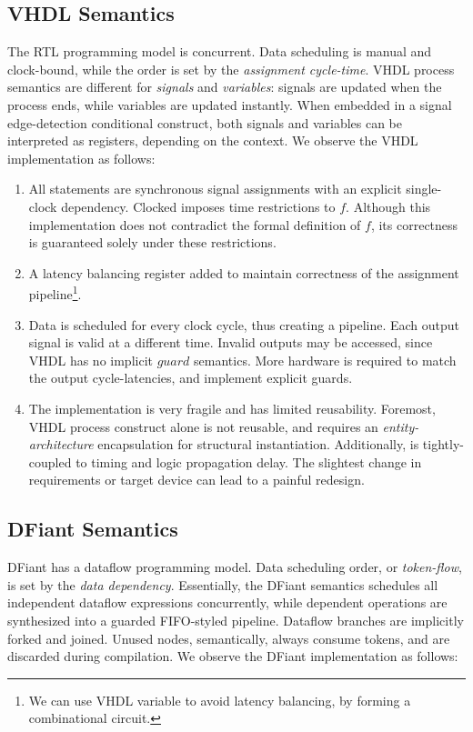 \subsection{VHDL Semantics}
The RTL programming model is concurrent. Data scheduling is manual and clock-bound, while the order is set by the \textit{assignment cycle-time}. VHDL process semantics are different for \textit{signals} and \textit{variables}: signals are updated when the process ends, while variables are updated instantly. When embedded in a signal edge-detection conditional construct, both signals and variables can be interpreted as registers, depending on the context. We observe the VHDL  implementation as follows:

\begin{enumerate}
  \item All statements are synchronous signal assignments with an explicit single-clock dependency. Clocked  imposes time restrictions to $f$. Although this implementation does not contradict the formal definition of $f$, its correctness is guaranteed solely under these restrictions.
  \item A latency balancing register added to maintain correctness of the  assignment pipeline\footnote{We can use VHDL variable to avoid latency balancing, by forming a combinational circuit.}. 
  \item Data is scheduled for every clock cycle, thus creating a pipeline. Each output signal is valid at a different time. Invalid outputs may be accessed, since VHDL has no implicit $guard$ semantics. More hardware is required to match the output cycle-latencies, and implement explicit guards.
  \item The implementation is very fragile and has limited reusability. Foremost, VHDL process construct alone is not reusable, and requires an \textit{entity-architecture} encapsulation for structural instantiation. Additionally,  is tightly-coupled to  timing and logic propagation delay. The slightest change in requirements or target device can lead to a painful redesign. 
\end{enumerate}

\subsection{DFiant Semantics}
DFiant has a dataflow programming model. Data scheduling order, or \textit{token-flow}, is set by the \textit{data dependency}. Essentially, the DFiant semantics schedules all independent dataflow expressions concurrently, while dependent operations are synthesized into a guarded FIFO-styled pipeline. Dataflow branches are implicitly forked and joined. Unused nodes, semantically, always consume tokens, and are discarded during compilation. We observe the DFiant  implementation as follows:

